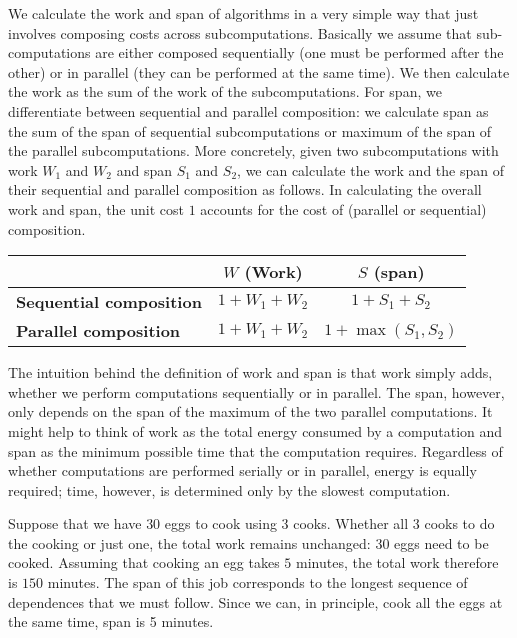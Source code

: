 \begin{flex}
\begin{definition}
We calculate the work and span of algorithms in a very
simple way that just involves composing costs across subcomputations.
%
Basically we assume that sub-computations are either composed
sequentially (one must be performed after the other) or in parallel
(they can be performed at the same time).
%
We then calculate the work as the sum of the work of the
subcomputations.
%
For span, we differentiate between sequential and parallel composition:
%
we calculate span as the sum of the span of sequential
subcomputations or maximum of the span of the parallel
subcomputations.
%
More concretely, given two subcomputations with work $W_1$ and $W_2$
and span $S_1$ and $S_2$, we can calculate the work and the span of
their sequential and parallel composition as follows.
%
In calculating the overall work and span, the unit cost $1$ accounts
for the cost of (parallel or sequential) composition.


\begin{center}
\renewcommand{\arraystretch}{1.5}
\begin{tabular}{lcc}
\toprule
                          &  \bf $W$ (Work) & \bf $S$ (span)\\
\midrule
\bf Sequential composition & $1 + W_1 + W_2$ & $1 + S_1+ S_2$\\
\midrule
\bf Parallel composition   & $1 + W_1 + W_2$ & $1 + \max(S_1, S_2)$\\
\bottomrule
\end{tabular}
\end{center}
\end{definition}

\begin{note}
The intuition behind the definition of work and span is that work
simply adds, whether we perform computations sequentially or in
parallel.  The span, however, only depends on the span of the maximum
of the two parallel computations.  It might help to think of work as
the total energy consumed by a computation and span as the minimum
possible time that the computation requires.  Regardless of whether
computations are performed serially or in parallel, energy is equally
required; time, however, is determined only by the slowest
computation.
\end{note}


\begin{example}
Suppose that we have $30$ eggs to cook using $3$ cooks.  Whether all
$3$ cooks to do the cooking or just one, the total work remains
unchanged: $30$ eggs need to be cooked.
%
Assuming that cooking an egg takes $5$ minutes, the total work
therefore is $150$ minutes.
%
The span of this job corresponds to the longest sequence of
dependences that we must follow.
%
Since we can, in principle, cook all the eggs at the same time, 
span is 5 minutes.
%


\end{example}
\end{flex}
